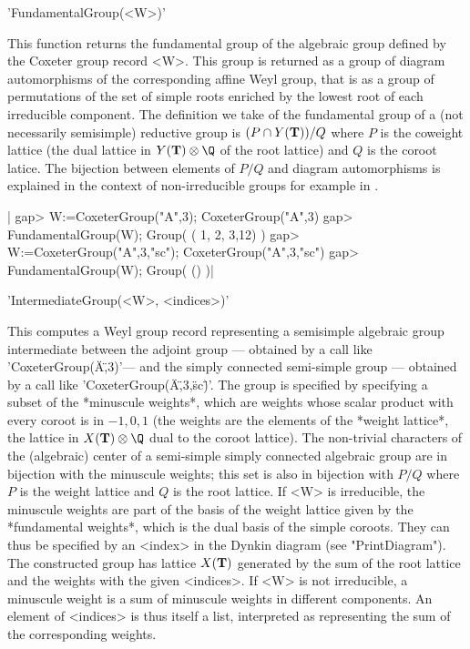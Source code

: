 
'FundamentalGroup(<W>)'

This  function returns the fundamental group of the algebraic group defined
by  the Coxeter  group record  <W>. This  group is  returned as  a group of
diagram  automorphisms of the corresponding affine Weyl group, that is as a
group  of permutations of  the set of  simple roots enriched  by the lowest
root  of  each  irreducible  component.  The  definition  we  take  of  the
fundamental  group  of  a  (not  necessarily semisimple) reductive group is
$(P\cap  Y({\mathbf T}))/Q$ where $P$ is the  coweight lattice (the dual lattice in
$Y(\bT)\otimes\Q$  of the root  lattice) and $Q$  is the coroot latice. The
bijection  between elements of $P/Q$ and diagram automorphisms is explained
in   the  context  of  non-irreducible   groups  for  example  in  \cite[\S
3.B]{Bon05}.

|    gap> W:=CoxeterGroup("A",3);
    CoxeterGroup("A",3)
    gap> FundamentalGroup(W);
    Group( ( 1, 2, 3,12) )
    gap> W:=CoxeterGroup("A",3,"sc");
    CoxeterGroup("A",3,"sc")
    gap> FundamentalGroup(W);
    Group( () )|


'IntermediateGroup(<W>, <indices>)'

This computes a Weyl group record representing a semisimple algebraic group
intermediate  between  the  adjoint  group  ---  obtained  by  a  call like
'CoxeterGroup(\"A\",3)'---  and the simply  connected semi-simple group ---
obtained  by  a  call  like  'CoxeterGroup(\"A\",3,\"sc\")'.  The  group is
specified  by specifying  a subset  of the  *minuscule weights*,  which are
weights  whose scalar product with every coroot is in $-1,0,1$ (the weights
are  the elements of the *weight lattice*, the lattice in $X(\bT)\otimes\Q$
dual  to the coroot lattice). The non-trivial characters of the (algebraic)
center  of a semi-simple simply connected  algebraic group are in bijection
with  the minuscule weights; this set is also in bijection with $P/Q$ where
$P$  is  the  weight  lattice  and  $Q$  is  the  root  lattice.  If <W> is
irreducible,  the minuscule  weights are  part of  the basis  of the weight
lattice  given by the *fundamental weights*, which is the dual basis of the
simple  coroots. They  can thus  be specified  by an  <index> in the Dynkin
diagram  (see "PrintDiagram").  The constructed  group has lattice $X({\mathbf T})$
generated  by the sum  of the root  lattice and the  weights with the given
<indices>.  If  <W>  is  not  irreducible,  a  minuscule weight is a sum of
minuscule  weights in different components. An element of <indices> is thus
itself  a list,  interpreted as  representing the  sum of the corresponding
weights.

